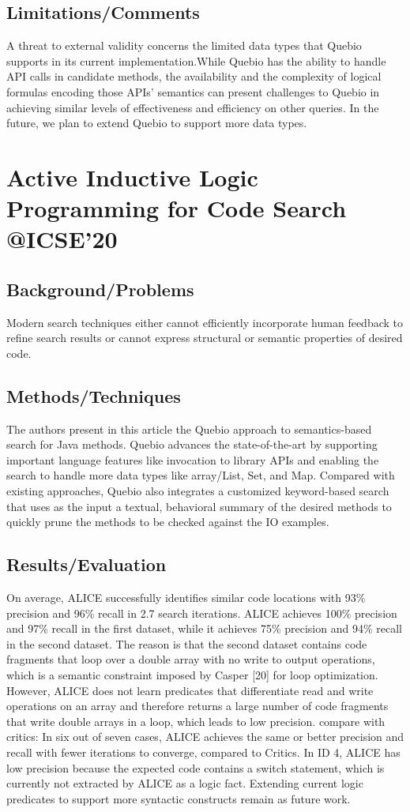 \subsection{Limitations/Comments}
A threat to external validity concerns the limited data types that Quebio supports in its current implementation.While Quebio has the ability to handle API calls in candidate methods, the availability and the complexity of logical formulas encoding those APIs’ semantics can present challenges to Quebio in achieving similar levels of effectiveness and efficiency on other queries. In the future, we plan to extend Quebio to support more data types.
\newpage

\section{Active Inductive Logic Programming for Code Search @ICSE'20}
\subsection{Background/Problems}
Modern search techniques either cannot efficiently incorporate human feedback to refine search results or cannot express structural or semantic properties of desired code.
\subsection{Methods/Techniques}
The authors present in this article the Quebio approach to semantics-based search for Java methods. Quebio advances the state-of-the-art by supporting important language features like invocation to library APIs and enabling the search to handle more data types like array/List, Set, and Map. Compared with existing approaches, Quebio also integrates a customized keyword-based search that uses as the input a textual, behavioral summary of the desired methods to quickly prune the methods to be checked against the IO examples.

\subsection{Results/Evaluation}
On average, ALICE successfully identifies similar code locations with 93\% precision and 96\% recall in 2.7 search iterations. ALICE achieves 100\% precision and 97\% recall in the first dataset, while it achieves 75\% precision and 94\% recall in the second dataset. The reason is that the second dataset contains code fragments that loop over a double array with no write to output operations, which is a semantic constraint imposed by Casper [20] for loop optimization. However, ALICE does not learn predicates that differentiate read and write operations on an array and therefore returns a large number of code fragments that write double arrays in a loop, which leads to low precision.
compare with critics:
In six out of seven cases, ALICE achieves the same or better precision and recall with fewer iterations to converge, compared to Critics. In ID 4, ALICE has low precision because the expected code contains a switch statement, which is currently not extracted by ALICE as a logic fact. Extending current logic predicates to support more syntactic constructs remain as future work.
